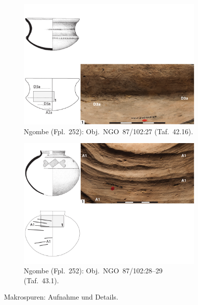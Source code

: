 \begin{multicols}{2}
\begin{figure}[p]
	\centering
	\begin{subfigure}{\textwidth}
		\centering
		\includegraphics[width = \textwidth]{fig/Abb_Macrotraces/NGO87-102-27.pdf}
		\caption{Ngombe (Fpl.~252): Obj.~NGO~87/102:27 (Taf.~42.16).\vspace{1em}}
		\label{NGO87-102-27_Makrospuren}
	\end{subfigure}
	\begin{subfigure}{\textwidth}
		\centering
		\includegraphics[width = \textwidth]{fig/Abb_Macrotraces/NGO87-102-28_29.pdf}
		\caption{Ngombe (Fpl.~252): Obj.~NGO~87/102:28--29 (Taf.~43.1).}
		\label{NGO87-102-28_29_Makrospuren}
	\end{subfigure}
	\caption{Makrospuren: Aufnahme und Details.}
\end{figure}


\end{multicols}
